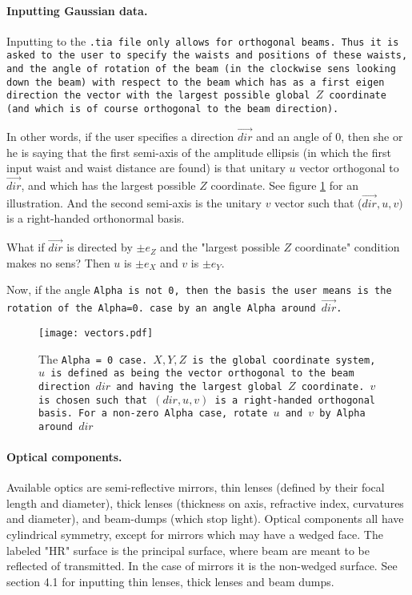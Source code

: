 \documentclass{article}
\begin{document}
\paragraph{Inputting Gaussian data.}Inputting to the \tt{.tia} file only allows for orthogonal beams. Thus it is asked to the user to specify the waists and positions of these waists, and the angle of rotation of the beam (in the clockwise sens looking down the beam) with respect to the beam which has as a first eigen direction the vector with the largest possible global $Z$ coordinate (and which is of course orthogonal to the beam direction).

In other words, if the user specifies a direction $\vec{dir}$ and an angle of 0, then she or he is saying that the first semi-axis of the amplitude ellipsis (in which the first input waist and waist distance are found) is that unitary $u$ vector orthogonal to $\vec{dir}$, and which has the largest possible $Z$ coordinate. See figure \ref{vectors} for an illustration. And the second semi-axis is the unitary $v$ vector such that ($\vec{dir}, u, v)$ is a right-handed orthonormal basis.

What if $\vec{dir}$ is directed by $\pm e_Z$ and the "largest possible $Z$ coordinate" condition makes no sens? Then $u$ is $\pm e_X$ and $v$ is $\pm e_Y$.

Now, if the angle \tt{Alpha} is not 0, then the basis the user means is the rotation of the \tt{Alpha=0.} case by an angle \tt{Alpha} around $\vec{dir}$.

\begin{figure}[h]
\begin{center}
\texttt{[image: vectors.pdf]}
\caption{The \tt{Alpha = 0} case. $X, Y, Z$ is the global coordinate system, $u$ is defined as being the vector orthogonal to the beam direction $dir$ and having the largest global $Z$ coordinate. $v$ is chosen such that $(dir, u, v)$ is a right-handed orthogonal basis. For a non-zero  \tt{Alpha} case, rotate $u$ and $v$ by \tt{Alpha} around $dir$}
\label{vectors}
\end{center}
\end{figure}

\paragraph{Optical components.}Available optics are semi-reflective mirrors, thin lenses (defined by their focal length and diameter), thick lenses (thickness on axis, refractive index, curvatures and diameter), and beam-dumps (which stop light). Optical components all have cylindrical symmetry, except for mirrors which may have a wedged face. The labeled "HR" surface is the principal surface, where beam are meant to be reflected of transmitted. In the case of mirrors it is the non-wedged surface. See section 4.1 for inputting thin lenses, thick lenses and beam dumps.
\end{document}
